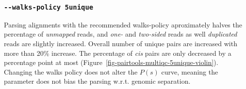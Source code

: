 \documentclass[
  11pt,
  a4paper,
]{scrbook}
\begin{document}
\subsubsection{\texorpdfstring{\texttt{-\/-walks-policy\ 5unique}}{-\/-walks-policy 5unique}}\label{walks-policy-5unique}

Parsing alignments with the recommended walks-policy aproximately halves
the percentage of \emph{unmapped} reads, and \emph{one-} and
\emph{two-sided} reads as well \emph{duplicated} reads are slightly
increased. Overall number of unique pairs are increased with more than
20\% increase. The percentage of \emph{cis} pairs are only decreased by
a percentage point at most
(Figure~\ref{fig-pairtools-multiqc-5unique-violin}). Changing the walks
policy does not alter the \(P(s)\) curve, meaning the parameter does not
bias the parsing w.r.t. genomic separation.
\end{document}
